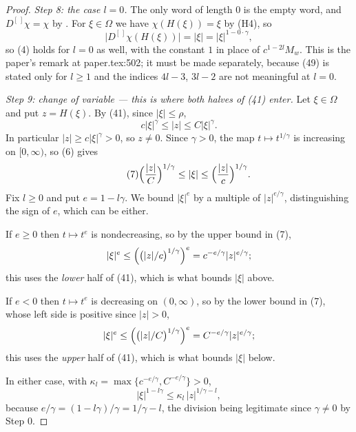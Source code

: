 \begin{proof}
\emph{Step 8: the case $l=0$.}  The only word of length $0$ is the empty word,
and $D^{[\,]}\chi=\chi$ by .  For $\xi\in\Omega$ we have
$\chi(H(\xi))=\xi$ by (H4), so
\begin{equation}\tag{5}
  \bigl|D^{[\,]}\chi(H(\xi))\bigr|=|\xi|=|\xi|^{1-0\cdot\gamma},
\end{equation}
so (4) holds for $l=0$ as well, with the constant $1$ in place of
$c^{1-2l}M_w$.  This is the paper's remark at paper.tex:502; it must be made
separately, because (49) is stated only for $l\ge1$ and the indices
$4l-3$, $3l-2$ are not meaningful at $l=0$.

\emph{Step 9: change of variable --- this is where both halves of (41) enter.}
Let $\xi\in\Omega$ and put $z=H(\xi)$.  By (41), since $|\xi|\le\rho$,
\begin{equation}\tag{6}
  c|\xi|^{\gamma}\le|z|\le C|\xi|^{\gamma}.
\end{equation}
In particular $|z|\ge c|\xi|^{\gamma}>0$, so $z\neq0$.  Since $\gamma>0$, the
map $t\mapsto t^{1/\gamma}$ is increasing on $[0,\infty)$, so (6) gives
\begin{equation}\tag{7}
  \Bigl(\frac{|z|}{C}\Bigr)^{1/\gamma}\le|\xi|\le\Bigl(\frac{|z|}{c}\Bigr)^{1/\gamma}.
\end{equation}
Fix $l\ge0$ and put $e=1-l\gamma$.  We bound $|\xi|^{e}$ by a multiple of
$|z|^{e/\gamma}$, distinguishing the sign of $e$, which can be either.

If $e\ge0$ then $t\mapsto t^{e}$ is nondecreasing, so by the upper bound in
(7),
\[
  |\xi|^{e}\le\Bigl(\bigl(|z|/c\bigr)^{1/\gamma}\Bigr)^{e}
  =c^{-e/\gamma}|z|^{e/\gamma};
\]
this uses the \emph{lower} half of (41), which is what bounds $|\xi|$ above.

If $e<0$ then $t\mapsto t^{e}$ is decreasing on $(0,\infty)$, so by the lower
bound in (7), whose left side is positive since $|z|>0$,
\[
  |\xi|^{e}\le\Bigl(\bigl(|z|/C\bigr)^{1/\gamma}\Bigr)^{e}
  =C^{-e/\gamma}|z|^{e/\gamma};
\]
this uses the \emph{upper} half of (41), which is what bounds $|\xi|$ below.

In either case, with
$\kappa_l=\max\{c^{-e/\gamma},C^{-e/\gamma}\}>0$,
\begin{equation}\tag{8}
  |\xi|^{1-l\gamma}\le\kappa_l\,|z|^{1/\gamma-l},
\end{equation}
because $e/\gamma=(1-l\gamma)/\gamma=1/\gamma-l$, the division being
legitimate since $\gamma\neq0$ by Step 0.


\end{proof}
